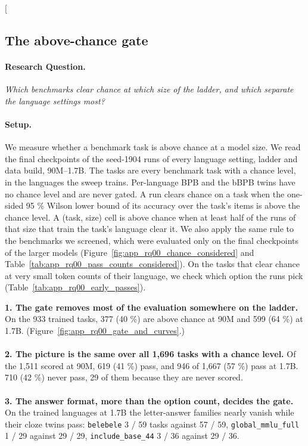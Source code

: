 \clearpage
\twocolumn[{%
\rqparent
\subsection{The above-chance gate}
\label{app:rq00_gate_and_curves}

\noindent\begin{minipage}[t]{0.485\textwidth}
\vspace{0pt}
\paragraph{Research Question.} \emph{Which benchmarks clear chance at which size of the ladder, and which separate the language settings most?}

\paragraph{Setup.} We measure whether a benchmark task is above chance at a model size. We read the final checkpoints of the seed-1904 runs of every language setting, ladder and data build, 90M--1.7B. The tasks are every benchmark task with a chance level, in the languages the sweep trains. Per-language BPB and the bBPB twins have no chance level and are never gated. A run clears chance on a task when the one-sided 95 \% Wilson lower bound of its accuracy over the task's items is above the chance level. A (task, size) cell is above chance when at least half of the runs of that size that train the task's language clear it. We also apply the same rule to the benchmarks we screened, which were evaluated only on the final checkpoints of the larger models (Figure~\ref{fig:app_rq00_chance_considered} and Table~\ref{tab:app_rq00_pass_counts_considered}). On the tasks that clear chance at very small token counts of their language, we check which option the runs pick (Table~\ref{tab:app_rq00_early_passes}).
\end{minipage}\hfill
\begin{minipage}[t]{0.485\textwidth}
\vspace{0pt}
\begin{rqfinding}
\textbf{1. The gate removes most of the evaluation somewhere on the ladder.} On the 933 trained tasks, 377 (40 \%) are above chance at 90M and 599 (64 \%) at 1.7B. (Figure~\ref{fig:app_rq00_gate_and_curves}.)
\\
\\
\textbf{2. The picture is the same over all 1,696 tasks with a chance level.} Of the 1,511 scored at 90M, 619 (41 \%) pass, and 946 of 1,667 (57 \%) pass at 1.7B. 710 (42 \%) never pass, 29 of them because they are never scored.
\\
\\
\textbf{3. The answer format, more than the option count, decides the gate.} On the trained languages at 1.7B the letter-answer families nearly vanish while their cloze twins pass: \texttt{belebele} 3 / 59 tasks against 57 / 59, \texttt{global\_mmlu\_full} 1 / 29 against 29 / 29, \texttt{include\_base\_44} 3 / 36 against 29 / 36.
\end{rqfinding}
\end{minipage}

}
